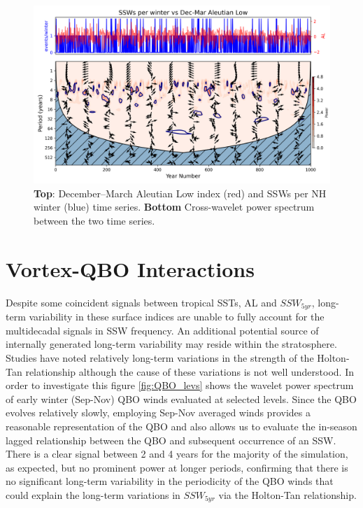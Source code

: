 \begin{figure}[h!]
\begin{center}
\includegraphics[width = \linewidth]{Figures/Figures-origins/SSWs_vs_AL_wavelet_unsmoothed.png}
\caption[Wavelet cross power spectrum between AL index and SSW timeseries]{\textbf{Top}: December–March Aleutian Low index (red) and SSWs per NH winter (blue) time series. \textbf{Bottom} Cross-wavelet power spectrum between the two time series.}
\label{fig:AL_unsmoothed_wavelet}
\end{center}
\end{figure}


\section{Vortex-QBO Interactions}
Despite some coincident signals between tropical SSTs, AL and $SSW_{5yr}$, long-term variability in these surface indices are unable to fully account for the  multidecadal signals in SSW frequency. An additional potential source of internally generated long-term variability may reside within the stratosphere. Studies have noted relatively long-term variations in the strength of the Holton-Tan relationship \citep{luDecadalscale2008,luMechanisms2014c,ospreyClimatology2010b} although the cause of these variations is not well understood. In order to investigate this figure \ref{fig:QBO_levs} shows the wavelet power spectrum of early winter (Sep-Nov) QBO winds evaluated at selected levels. Since the QBO evolves relatively slowly, employing Sep-Nov averaged winds provides a reasonable representation of the QBO and also allows us to evaluate the in-season lagged relationship between the QBO and subsequent occurrence of an SSW. There is a clear signal between 2 and 4 years for the majority of the simulation, as expected, but no prominent power at longer periods,  confirming that there is no significant long-term variability in the periodicity of the QBO winds that could explain the long-term variations in $SSW_{5yr}$ via the Holton-Tan relationship.


